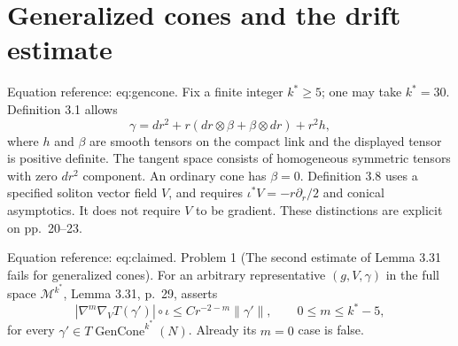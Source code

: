 \documentclass[10pt]{article}
\begin{document}
\section*{Generalized cones and the drift estimate}
Equation reference: eq:gencone. Fix a finite integer \(k^*\geq 5\); one may take \(k^*=30\). Definition 3.1 allows \[
 \gamma=dr^2+r(dr\otimes\beta+\beta\otimes dr)+r^2h,\] where \(h\) and \(\beta\) are smooth tensors on the compact link and the displayed tensor is positive definite. The tangent space consists of homogeneous symmetric tensors with zero \(dr^2\) component. An ordinary cone has \(\beta=0\). Definition 3.8 uses a specified soliton vector field \(V\), and requires \(\iota^*V=-r\partial_r/2\) and conical asymptotics. It does not require \(V\) to be gradient. These distinctions are explicit on pp. 20–23.\par
Equation reference: eq:claimed. Problem 1 (The second estimate of Lemma 3.31 fails for generalized cones).  For an arbitrary representative \((g,V,\gamma)\) in the full space \(\mathcal M^{k^*}\), Lemma 3.31, p. 29, asserts \[
 \left|\nabla^m\nabla_V T(\gamma')\right|\circ\iota
 \leq C r^{-2-m}\|\gamma'\|,\qquad 0\leq m\leq k^*-5,\] for every \(\gamma'\in T\operatorname{GenCone}^{k^*}(N)\). Already its \(m=0\) case is false.\par
\end{document}
